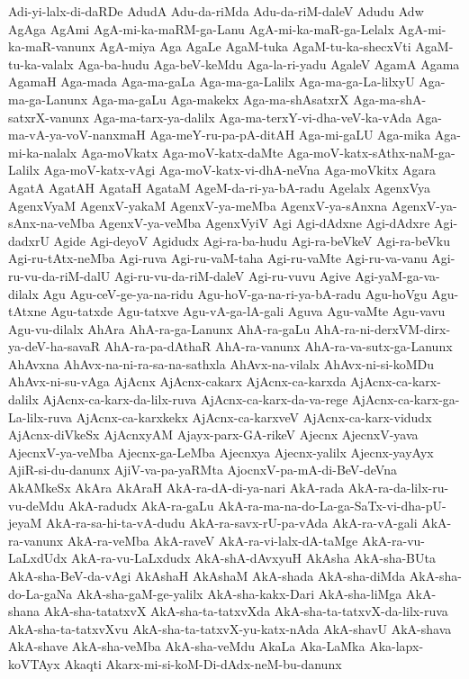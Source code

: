 {Adi-yi-lalx-di-daRDe
AdudA
Adu-da-riMda
Adu-da-riM-daleV
Adudu
Adw
AgAga
AgAmi
AgA-mi-ka-maRM-ga-Lanu
AgA-mi-ka-maR-ga-Lelalx
AgA-mi-ka-maR-vanunx
AgA-miya
Aga
AgaLe
AgaM-tuka
AgaM-tu-ka-shecxVti
AgaM-tu-ka-valalx
Aga-ba-hudu
Aga-beV-keMdu
Aga-la-ri-yadu
AgaleV
AgamA
Agama
AgamaH
Aga-mada
Aga-ma-gaLa
Aga-ma-ga-Lalilx
Aga-ma-ga-La-lilxyU
Aga-ma-ga-Lanunx
Aga-ma-gaLu
Aga-makekx
Aga-ma-shAsatxrX
Aga-ma-shA-satxrX-vanunx
Aga-ma-tarx-ya-dalilx
Aga-ma-terxY-vi-dha-veV-ka-vAda
Aga-ma-vA-ya-voV-nanxmaH
Aga-meY-ru-pa-pA-ditAH
Aga-mi-gaLU
Aga-mika
Aga-mi-ka-nalalx
Aga-moVkatx
Aga-moV-katx-daMte
Aga-moV-katx-sAthx-naM-ga-Lalilx
Aga-moV-katx-vAgi
Aga-moV-katx-vi-dhA-neVna
Aga-moVkitx
Agara
AgatA
AgatAH
AgataH
AgataM
AgeM-da-ri-ya-bA-radu
Agelalx
AgenxVya
AgenxVyaM
AgenxV-yakaM
AgenxV-ya-meMba
AgenxV-ya-sAnxna
AgenxV-ya-sAnx-na-veMba
AgenxV-ya-veMba
AgenxVyiV
Agi
Agi-dAdxne
Agi-dAdxre
Agi-dadxrU
Agide
Agi-deyoV
Agidudx
Agi-ra-ba-hudu
Agi-ra-beVkeV
Agi-ra-beVku
Agi-ru-tAtx-neMba
Agi-ruva
Agi-ru-vaM-taha
Agi-ru-vaMte
Agi-ru-va-vanu
Agi-ru-vu-da-riM-dalU
Agi-ru-vu-da-riM-daleV
Agi-ru-vuvu
Agive
Agi-yaM-ga-va-dilalx
Agu
Agu-ceV-ge-ya-na-ridu
Agu-hoV-ga-na-ri-ya-bA-radu
Agu-hoVgu
Agu-tAtxne
Agu-tatxde
Agu-tatxve
Agu-vA-ga-lA-gali
Aguva
Agu-vaMte
Agu-vavu
Agu-vu-dilalx
AhAra
AhA-ra-ga-Lanunx
AhA-ra-gaLu
AhA-ra-ni-derxVM-dirx-ya-deV-ha-savaR
AhA-ra-pa-dAthaR
AhA-ra-vanunx
AhA-ra-va-sutx-ga-Lanunx
AhAvxna
AhAvx-na-ni-ra-sa-na-sathxla
AhAvx-na-vilalx
AhAvx-ni-si-koMDu
AhAvx-ni-su-vAga
AjAcnx
AjAcnx-cakarx
AjAcnx-ca-karxda
AjAcnx-ca-karx-dalilx
AjAcnx-ca-karx-da-lilx-ruva
AjAcnx-ca-karx-da-va-rege
AjAcnx-ca-karx-ga-La-lilx-ruva
AjAcnx-ca-karxkekx
AjAcnx-ca-karxveV
AjAcnx-ca-karx-vidudx
AjAcnx-diVkeSx
AjAcnxyAM
Ajayx-parx-GA-rikeV
Ajecnx
AjecnxV-yava
AjecnxV-ya-veMba
Ajecnx-ga-LeMba
Ajecnxya
Ajecnx-yalilx
Ajecnx-yayAyx
AjiR-si-du-danunx
AjiV-va-pa-yaRMta
AjocnxV-pa-mA-di-BeV-deVna
AkAMkeSx
AkAra
AkAraH
AkA-ra-dA-di-ya-nari
AkA-rada
AkA-ra-da-lilx-ru-vu-deMdu
AkA-radudx
AkA-ra-gaLu
AkA-ra-ma-na-do-La-ga-SaTx-vi-dha-pU-jeyaM
AkA-ra-sa-hi-ta-vA-dudu
AkA-ra-savx-rU-pa-vAda
AkA-ra-vA-gali
AkA-ra-vanunx
AkA-ra-veMba
AkA-raveV
AkA-ra-vi-lalx-dA-taMge
AkA-ra-vu-LaLxdUdx
AkA-ra-vu-LaLxdudx
AkA-shA-dAvxyuH
AkAsha
AkA-sha-BUta
AkA-sha-BeV-da-vAgi
AkAshaH
AkAshaM
AkA-shada
AkA-sha-diMda
AkA-sha-do-La-gaNa
AkA-sha-gaM-ge-yalilx
AkA-sha-kakx-Dari
AkA-sha-liMga
AkA-shana
AkA-sha-tatatxvX
AkA-sha-ta-tatxvXda
AkA-sha-ta-tatxvX-da-lilx-ruva
AkA-sha-ta-tatxvXvu
AkA-sha-ta-tatxvX-yu-katx-nAda
AkA-shavU
AkA-shava
AkA-shave
AkA-sha-veMba
AkA-sha-veMdu
AkaLa
Aka-LaMka
Aka-lapx-koVTAyx
Akaqti
Akarx-mi-si-koM-Di-dAdx-neM-bu-danunx
}
